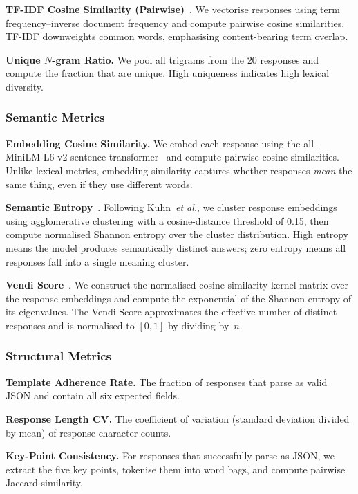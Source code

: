 \documentclass[11pt,a4paper]{article}
\newcommand{\etal}{\textit{et al.}}
\begin{document}
\textbf{TF-IDF Cosine Similarity (Pairwise)}~\citep{salton1988term}.
We vectorise responses using term frequency--inverse document frequency and compute pairwise cosine similarities.
TF-IDF downweights common words, emphasising content-bearing term overlap.

\textbf{Unique $N$-gram Ratio.}
We pool all trigrams from the 20 responses and compute the fraction that are unique.
High uniqueness indicates high lexical diversity.

\subsubsection{Semantic Metrics}

\textbf{Embedding Cosine Similarity.}
We embed each response using the all-MiniLM-L6-v2 sentence transformer~\citep{reimers2019sentence} and compute pairwise cosine similarities.
Unlike lexical metrics, embedding similarity captures whether responses \emph{mean} the same thing, even if they use different words.

\textbf{Semantic Entropy}~\citep{kuhn2023semantic}.
Following Kuhn~\etal, we cluster response embeddings using agglomerative clustering with a cosine-distance threshold of 0.15, then compute normalised Shannon entropy over the cluster distribution.
High entropy means the model produces semantically distinct answers; zero entropy means all responses fall into a single meaning cluster.

\textbf{Vendi Score}~\citep{friedman2023vendi}.
We construct the normalised cosine-similarity kernel matrix over the response embeddings and compute the exponential of the Shannon entropy of its eigenvalues.
The Vendi Score approximates the effective number of distinct responses and is normalised to $[0, 1]$ by dividing by~$n$.

\subsubsection{Structural Metrics}

\textbf{Template Adherence Rate.}
The fraction of responses that parse as valid JSON and contain all six expected fields.

\textbf{Response Length CV.}
The coefficient of variation (standard deviation divided by mean) of response character counts.

\textbf{Key-Point Consistency.}
For responses that successfully parse as JSON, we extract the five key points, tokenise them into word bags, and compute pairwise Jaccard similarity.
\end{document}
